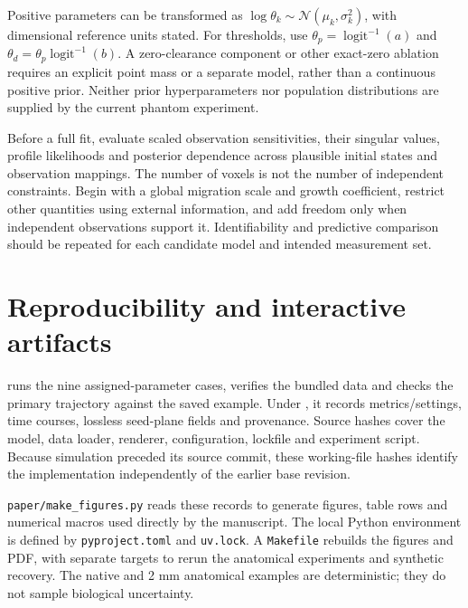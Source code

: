 Positive parameters can be transformed as $\log\theta_k\sim\mathcal N(\mu_k,\sigma_k^2)$, with dimensional reference units stated. For thresholds, use $\theta_p=\operatorname{logit}^{-1}(a)$ and $\theta_d=\theta_p\operatorname{logit}^{-1}(b)$. A zero-clearance component or other exact-zero ablation requires an explicit point mass or a separate model, rather than a continuous positive prior. Neither prior hyperparameters nor population distributions are supplied by the current phantom experiment.

Before a full fit, evaluate scaled observation sensitivities, their singular values, profile likelihoods and posterior dependence across plausible initial states and observation mappings. The number of voxels is not the number of independent constraints. Begin with a global migration scale and growth coefficient, restrict other quantities using external information, and add freedom only when independent observations support it. Identifiability and predictive comparison should be repeated for each candidate model and intended measurement set.

\section{Reproducibility and interactive artifacts}
 runs the nine assigned-parameter cases, verifies the bundled data and checks the primary trajectory against the saved example. Under , it records metrics/settings, time courses, lossless seed-plane fields and provenance. Source hashes cover the model, data loader, renderer, configuration, lockfile and experiment script. Because simulation preceded its source commit, these working-file hashes identify the implementation independently of the earlier base revision.

\texttt{paper/make\_figures.py} reads these records to generate figures, table rows and numerical macros used directly by the manuscript. The local Python environment is defined by \texttt{pyproject.toml} and \texttt{uv.lock}. A \texttt{Makefile} rebuilds the figures and PDF, with separate targets to rerun the anatomical experiments and synthetic recovery. The native and 2 mm anatomical examples are deterministic; they do not sample biological uncertainty.

